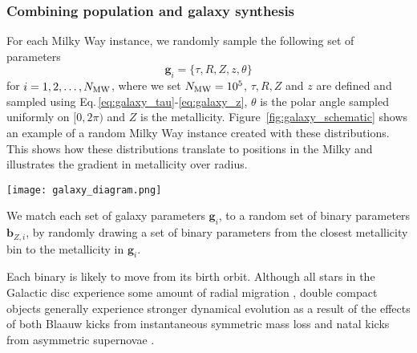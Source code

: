 \subsubsection{Combining population and galaxy synthesis}

For each Milky Way instance, we randomly sample the following set of parameters
\begin{equation}
    \mathbf{g}_{{i}} = \{\tau, R, Z, z, \theta\}
\end{equation}
for $i = 1, 2, \dots, N_{\rm MW}$, where we set $N_{\rm MW} = 10^{5}$, $\tau, R, Z$ and $z$ are defined and sampled using Eq.\,\ref{eq:galaxy_tau}-\ref{eq:galaxy_z}, $\theta$ is the polar angle sampled uniformly on $[0, 2\pi)$ and $Z$ is the metallicity. Figure~\ref{fig:galaxy_schematic} shows an example of a random Milky Way instance created with these distributions. This shows how these distributions translate to positions in the Milky and illustrates the gradient in metallicity over radius.

\begin{figure*}[t]
    \centering
    \texttt{[image: galaxy\_diagram.png]}
    \caption{A schematic showing how we create a mock Milky Way disc. On the left, we show the various distributions presented in \citet{Frankel+2018} and \citet{McMillan+2011}. On the right, we show an example instance of the Milky Way with $10^5$ binaries shown as points. The colour of each point represents its metallicity (with $Z \in [0.0001, 0.022]$). The top panel shows a side-on view and the bottom panel shows a view from above.}
    \label{fig:galaxy_schematic}
\end{figure*}


We match each set of galaxy parameters $\mathbf{g}_{{i}}$, to a random set of binary parameters $\mathbf{b}_{{Z, i}}$, by randomly drawing a set of binary parameters from the closest metallicity bin to the metallicity in $\mathbf{g}_{{i}}$.

Each binary is likely to move from its birth orbit. Although all stars in the Galactic disc experience some amount of radial migration \citep{Sellwood+2002, Frankel+2018}, double compact objects generally experience stronger dynamical evolution as a result of the effects of both Blaauw kicks from instantaneous symmetric mass loss \citep{Blaauw+1961} and natal kicks from asymmetric supernovae \citep{Hobbs+2005}.

